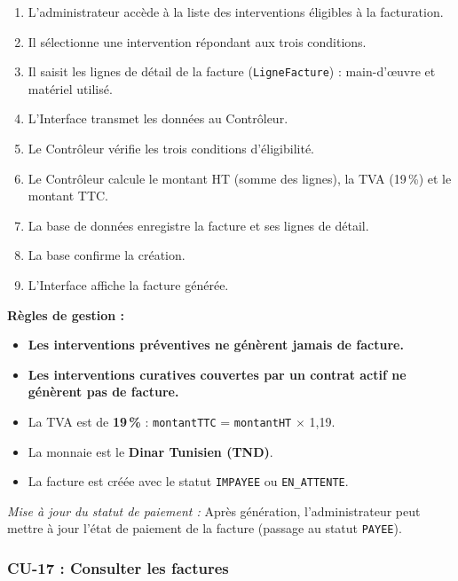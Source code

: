 \begin{enumerate}
    \item L'administrateur accède à la liste des interventions éligibles à la facturation.
    \item Il sélectionne une intervention répondant aux trois conditions.
    \item Il saisit les lignes de détail de la facture (\texttt{LigneFacture}) : main-d'œuvre et matériel utilisé.
    \item L'Interface transmet les données au Contrôleur.
    \item Le Contrôleur vérifie les trois conditions d'éligibilité.
    \item Le Contrôleur calcule le montant HT (somme des lignes), la TVA (19\,\%) et le montant TTC.
    \item La base de données enregistre la facture et ses lignes de détail.
    \item La base confirme la création.
    \item L'Interface affiche la facture générée.
\end{enumerate}

\textbf{Règles de gestion :}

\begin{itemize}
    \item \textbf{Les interventions préventives ne génèrent jamais de facture.}
    \item \textbf{Les interventions curatives couvertes par un contrat actif ne génèrent pas de facture.}
    \item La TVA est de \textbf{19\,\%} : \texttt{montantTTC} = \texttt{montantHT} $\times$ 1,19.
    \item La monnaie est le \textbf{Dinar Tunisien (TND)}.
    \item La facture est créée avec le statut \texttt{IMPAYEE} ou \texttt{EN\_ATTENTE}.
\end{itemize}

\textit{Mise à jour du statut de paiement :} Après génération, l'administrateur peut mettre à jour l'état de paiement de la facture (passage au statut \texttt{PAYEE}).

\subsubsection{CU-17 : Consulter les factures}

